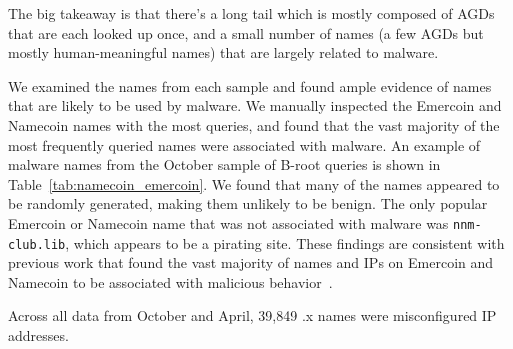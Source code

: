 The big takeaway is that there's a long tail which is mostly 
composed of AGDs that are each looked up once, and a small 
number of names (a few AGDs but mostly human-meaningful 
names) that are largely related to malware.

We examined the names from each sample 
and found ample evidence of names that are likely to be used by malware. We 
manually inspected 
the Emercoin and Namecoin names with the most queries, and found that the vast 
majority of the most 
frequently queried names were associated with malware. An example of malware 
names from the October 
sample of B-root queries is shown in Table~\ref{tab:namecoin_emercoin}. We 
found that many of the 
names appeared to be randomly generated, making them unlikely to be benign. 
 The only popular Emercoin 
or Namecoin name that was not associated with malware was 
\texttt{nnm-club.lib}, which appears to be a 
pirating site. These findings are consistent with previous work that found the 
vast majority of names 
and IPs on Emercoin and Namecoin to be associated with malicious 
behavior~\cite{patsakis_unravelling_2020, casino_unearthing_2021}. 


	
%

Across all data from October and April, 39,849 .x names were misconfigured IP 
addresses.

%


